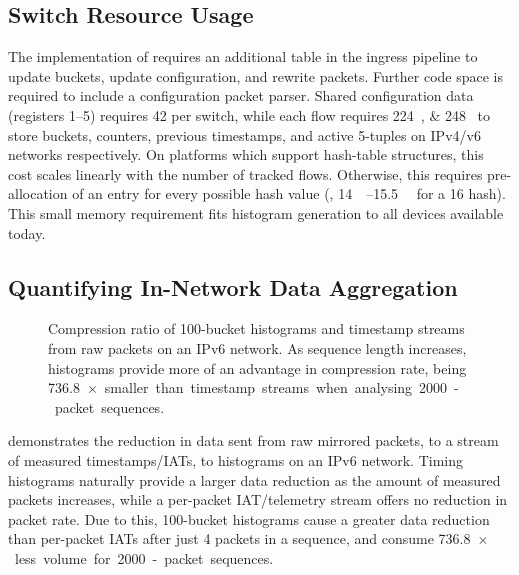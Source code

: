 \subsection{Switch Resource Usage}
The implementation of \seidr{} requires an additional table in the ingress pipeline to update buckets, update configuration, and rewrite packets.
Further code space is required to include a configuration packet parser.
Shared configuration data (registers \numrange{1}{5}) requires \SI{42}{\byte} per switch, while each flow requires \SIlist{224;248}{\byte} to store buckets, counters, previous timestamps, and active 5-tuples on IPv4/v6 networks respectively.
On platforms which support hash-table structures, this cost scales linearly with the number of tracked flows.
Otherwise, this requires pre-allocation of an entry for every possible hash value (\eg, \SIrange{14}{15.5}{\mebi\byte} for a \SI{16}{\bit} hash). This small memory requirement fits histogram generation to all devices available today.

\subsection{Quantifying In-Network Data Aggregation}

\begin{figure}
    \centering
    \caption{Compression ratio of \num{100}-bucket histograms and timestamp streams from raw packets on an IPv6 network. As sequence length increases, histograms provide more of an advantage in compression rate, being \SI{736.8}{$\times$} smaller than timestamp streams when analysing \num{2000}-packet sequences.}
    \label{fig:histo-compression}
\end{figure}


 demonstrates the reduction in data sent from raw mirrored packets, to a stream of measured timestamps/IATs, to \seidr{} histograms on an IPv6 network.
Timing histograms naturally provide a larger data reduction as the amount of measured packets increases, while a per-packet IAT/telemetry stream offers no reduction in packet rate.
Due to this, 100-bucket histograms cause a greater data reduction than per-packet IATs after just 4 packets in a sequence, and consume \SI{736.8}{$\times$} less volume for \num{2000}-packet sequences.

